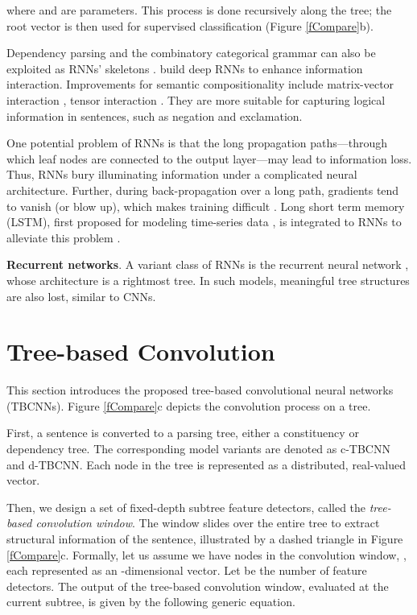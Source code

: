 \documentclass[11pt,a4paper]{article}
\begin{document}
\vspace{-.4cm}


\vspace{-.1cm}

\noindent where  and  are parameters.
This process is done recursively along the tree; the root vector is then used for supervised classification (Figure \ref{fCompare}b).

Dependency parsing and the combinatory categorical grammar can also be exploited
as RNNs' skeletons \cite{ccg,dependencyrnn}.
 build deep RNNs to enhance information interaction.
Improvements for semantic compositionality include matrix-vector interaction \cite{matrixvector}, tensor interaction \cite{RNN}. They are more suitable for 
capturing logical information in sentences, such as negation and exclamation.

One potential problem of RNNs is that the long propagation paths---through which leaf nodes are connected to the output layer---may lead to information loss.
Thus, RNNs bury illuminating information under a complicated neural architecture.
Further, during back-propagation over a long path, gradients tend to vanish (or blow up),
which makes training difficult \cite{difficulty}.
Long short term memory (LSTM), first proposed for modeling
time-series data \cite{lstm}, is integrated to RNNs to alleviate this problem \cite{lstm1,lstm2,lstm3}.

\textbf{Recurrent networks}.
A variant class of RNNs is the recurrent neural network \cite{rnndifficult,responding},
whose architecture is a rightmost tree.
In such models, meaningful tree structures are also lost, similar to CNNs.



\section{Tree-based Convolution}

This section introduces the proposed
tree-based convolutional neural networks (TBCNNs).
Figure \ref{fCompare}c depicts the convolution process on a tree.

First, a sentence is converted to a parsing tree,
either a constituency or dependency tree.
The corresponding model variants are denoted as c-TBCNN and d-TBCNN.
Each node in the tree is represented as a distributed, real-valued vector.

Then, we design a set of fixed-depth subtree feature detectors, called the
\textit{tree-based convolution window}.
The window
slides over the entire tree to extract structural information
of the sentence, illustrated by a dashed triangle in Figure \ref{fCompare}c.
Formally, let us assume we 
have  nodes in the convolution window, , 
each represented as an -dimensional vector.
Let  be the number of feature detectors.
The output of the tree-based convolution window, evaluated at the current subtree, is
given by the following generic equation.
\end{document}
